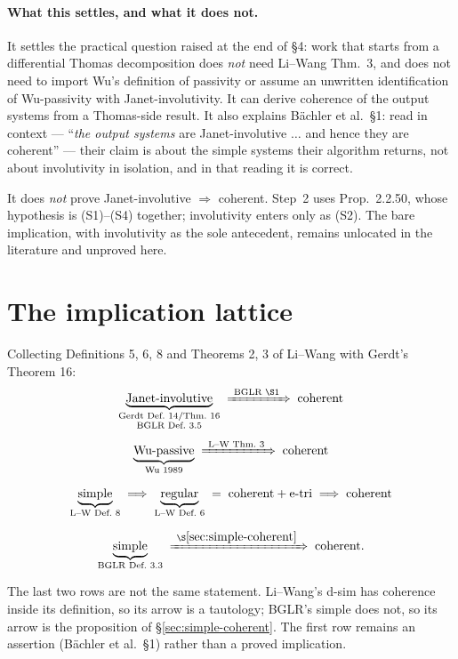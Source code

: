 \documentclass[11pt]{article}
\newcommand{\imp}{\;\Longrightarrow\;}
\begin{document}
\paragraph{What this settles, and what it does not.} It settles the practical
question raised at the end of \S4: work that starts from a differential Thomas
decomposition does \emph{not} need Li--Wang Thm.~3, and does not need to import
Wu's definition of passivity or assume an unwritten identification of
Wu-passivity with Janet-involutivity. It can derive coherence of the output
systems from a Thomas-side result. It also explains B\"achler et al.\ \S1: read
in context --- ``\emph{the output systems} are Janet-involutive $\dots$ and
hence they are coherent'' --- their claim is about the simple systems their
algorithm returns, not about involutivity in isolation, and in that reading it
is correct.

It does \emph{not} prove Janet-involutive $\Rightarrow$ coherent. Step~2 uses
Prop.~2.2.50, whose hypothesis is (S1)--(S4) together; involutivity enters only
as (S2). The bare implication, with involutivity as the sole antecedent, remains
unlocated in the literature and unproved here.

\section{The implication lattice}

Collecting Definitions 5, 6, 8 and Theorems 2, 3 of Li--Wang with Gerdt's
Theorem 16:
\[
\begin{gathered}
  \underbrace{\text{Janet-involutive}}_{\substack{\text{Gerdt Def.~14/Thm.~16}\\ \text{BGLR Def.~3.5}}}
  \;\xRightarrow{\ \text{BGLR \S1}\ }\;
  \text{coherent}
  \\[1ex]
  \underbrace{\text{Wu-passive}}_{\text{Wu 1989}}
  \;\xRightarrow{\ \text{L--W Thm.~3}\ }\;
  \text{coherent}
  \\[1.5ex]
  \underbrace{\text{simple}}_{\text{L--W Def.~8}}
  \imp
  \underbrace{\text{regular}}_{\text{L--W Def.~6}}
  \;=\;\text{coherent}+\text{e-tri}
  \imp
  \text{coherent}
  \\[1.5ex]
  \underbrace{\text{simple}}_{\text{BGLR Def.~3.3}}
  \;\xRightarrow{\ \S\ref{sec:simple-coherent}\ }\;
  \text{coherent}.
\end{gathered}
\]

\noindent
The last two rows are not the same statement. Li--Wang's d-sim has coherence
inside its definition, so its arrow is a tautology; BGLR's simple does not, so
its arrow is the proposition of \S\ref{sec:simple-coherent}. The first row
remains an assertion (B\"achler et al.\ \S1) rather than a proved implication.
\end{document}
